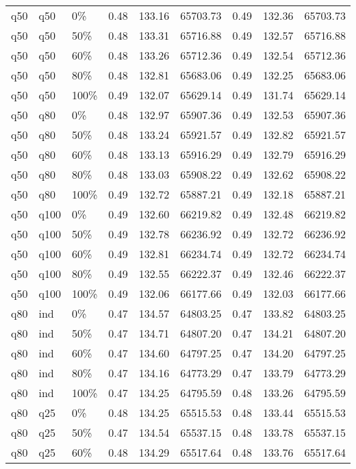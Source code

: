 \begin{longtable}{lllrrrrrr}
  q50 & q50 & 0\% & 0.48 & 133.16 & 65703.73 & 0.49 & 132.36 & 65703.73 \\ 
  q50 & q50 & 50\% & 0.48 & 133.31 & 65716.88 & 0.49 & 132.57 & 65716.88 \\ 
  q50 & q50 & 60\% & 0.48 & 133.26 & 65712.36 & 0.49 & 132.54 & 65712.36 \\ 
  q50 & q50 & 80\% & 0.48 & 132.81 & 65683.06 & 0.49 & 132.25 & 65683.06 \\ 
  q50 & q50 & 100\% & 0.49 & 132.07 & 65629.14 & 0.49 & 131.74 & 65629.14 \\ 
  q50 & q80 & 0\% & 0.48 & 132.97 & 65907.36 & 0.49 & 132.53 & 65907.36 \\ 
  q50 & q80 & 50\% & 0.48 & 133.24 & 65921.57 & 0.49 & 132.82 & 65921.57 \\ 
  q50 & q80 & 60\% & 0.48 & 133.13 & 65916.29 & 0.49 & 132.79 & 65916.29 \\ 
  q50 & q80 & 80\% & 0.48 & 133.03 & 65908.22 & 0.49 & 132.62 & 65908.22 \\ 
  q50 & q80 & 100\% & 0.49 & 132.72 & 65887.21 & 0.49 & 132.18 & 65887.21 \\ 
  q50 & q100 & 0\% & 0.49 & 132.60 & 66219.82 & 0.49 & 132.48 & 66219.82 \\ 
  q50 & q100 & 50\% & 0.49 & 132.78 & 66236.92 & 0.49 & 132.72 & 66236.92 \\ 
  q50 & q100 & 60\% & 0.49 & 132.81 & 66234.74 & 0.49 & 132.72 & 66234.74 \\ 
  q50 & q100 & 80\% & 0.49 & 132.55 & 66222.37 & 0.49 & 132.46 & 66222.37 \\ 
  q50 & q100 & 100\% & 0.49 & 132.06 & 66177.66 & 0.49 & 132.03 & 66177.66 \\ 
  q80 & ind & 0\% & 0.47 & 134.57 & 64803.25 & 0.47 & 133.82 & 64803.25 \\ 
  q80 & ind & 50\% & 0.47 & 134.71 & 64807.20 & 0.47 & 134.21 & 64807.20 \\ 
  q80 & ind & 60\% & 0.47 & 134.60 & 64797.25 & 0.47 & 134.20 & 64797.25 \\ 
  q80 & ind & 80\% & 0.47 & 134.16 & 64773.29 & 0.47 & 133.79 & 64773.29 \\ 
  q80 & ind & 100\% & 0.47 & 134.25 & 64795.59 & 0.48 & 133.26 & 64795.59 \\ 
  q80 & q25 & 0\% & 0.48 & 134.25 & 65515.53 & 0.48 & 133.44 & 65515.53 \\ 
  q80 & q25 & 50\% & 0.47 & 134.54 & 65537.15 & 0.48 & 133.78 & 65537.15 \\ 
  q80 & q25 & 60\% & 0.48 & 134.29 & 65517.64 & 0.48 & 133.76 & 65517.64 \\ 

\end{longtable}
